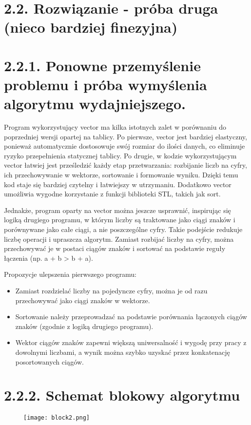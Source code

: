 \documentclass[a4paper,12pt]{article}
\begin{document}
	\section{2.2. Rozwiązanie - próba druga (nieco bardziej finezyjna)}	
	\section{\small2.2.1. Ponowne przemyślenie problemu i próba wymyślenia algorytmu wydajniejszego.}
	Program wykorzystujący vector ma kilka istotnych zalet w porównaniu do poprzedniej wersji opartej na tablicy. Po pierwsze, vector jest bardziej elastyczny, ponieważ automatycznie dostosowuje swój rozmiar do ilości danych, co eliminuje ryzyko przepełnienia statycznej tablicy. Po drugie, w kodzie wykorzystującym vector łatwiej jest prześledzić każdy etap przetwarzania: rozbijanie liczb na cyfry, ich przechowywanie w wektorze, sortowanie i formowanie wyniku. Dzięki temu kod staje się bardziej czytelny i łatwiejszy w utrzymaniu. Dodatkowo vector umożliwia wygodne korzystanie z funkcji biblioteki STL, takich jak sort.
	
	Jednakże, program oparty na vector można jeszcze usprawnić, inspirując się logiką drugiego programu, w którym liczby są traktowane jako ciągi znaków i porównywane jako całe ciągi, a nie poszczególne cyfry. Takie podejście redukuje liczbę operacji i upraszcza algorytm. Zamiast rozbijać liczby na cyfry, można przechowywać je w postaci ciągów znaków i sortować na podstawie reguły łączenia (np. a + b > b + a).
	
	Propozycje ulepszenia pierwszego programu:
	\begin{itemize}
		\setlength{\itemindent}{1cm}
		\item Zamiast rozdzielać liczby na pojedyncze cyfry, można je od razu przechowywać jako ciągi znaków w wektorze.
		\item Sortowanie należy przeprowadzać na podstawie porównania łączonych ciągów znaków (zgodnie z logiką drugiego programu).
		\item Wektor ciągów znaków zapewni większą uniwersalność i wygodę przy pracy z dowolnymi liczbami, a wynik można szybko uzyskać przez konkatenację posortowanych ciągów.
	\end{itemize} 
	\newpage
	\section{2.2.2. Schemat blokowy algorytmu}
	\begin{figure}[h!]
		\centering\texttt{[image: block2.png]}
	\end{figure}
	\newpage
\end{document}
